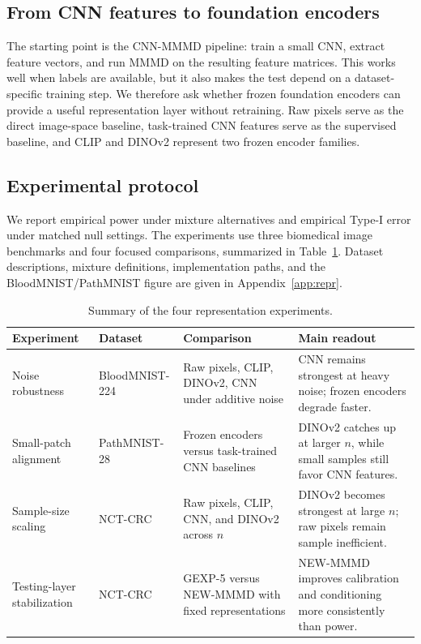 \documentclass[12pt]{article}
\begin{document}
\subsection{From CNN features to foundation encoders}

The starting point is the CNN-MMMD pipeline: train a small CNN, extract feature vectors, and run MMMD on the resulting feature matrices. This works well when labels are available, but it also makes the test depend on a dataset-specific training step. We therefore ask whether frozen foundation encoders can provide a useful representation layer without retraining. Raw pixels serve as the direct image-space baseline, task-trained CNN features serve as the supervised baseline, and CLIP and DINOv2 represent two frozen encoder families.

\subsection{Experimental protocol}

We report empirical power under mixture alternatives and empirical Type-I error under matched null settings. The experiments use three biomedical image benchmarks and four focused comparisons, summarized in Table~\ref{tab:foundation-exp-summary}. Dataset descriptions, mixture definitions, implementation paths, and the BloodMNIST/PathMNIST figure are given in Appendix~\ref{app:repr}.

\begin{table}[H]
\centering
\caption{Summary of the four representation experiments.}
\label{tab:foundation-exp-summary}
\scriptsize
\setlength{\tabcolsep}{3pt}
\begin{tabular}{>{\raggedright\arraybackslash}p{}
                >{\raggedright\arraybackslash}p{}
                >{\raggedright\arraybackslash}p{}
                >{\raggedright\arraybackslash}p{}}
\toprule
Experiment & Dataset & Comparison & Main readout \\
\midrule
Noise robustness & BloodMNIST-224 & Raw pixels, CLIP, DINOv2, CNN under additive noise & CNN remains strongest at heavy noise; frozen encoders degrade faster. \\
Small-patch alignment & PathMNIST-28 & Frozen encoders versus task-trained CNN baselines & DINOv2 catches up at larger \(n\), while small samples still favor CNN features. \\
Sample-size scaling & NCT-CRC & Raw pixels, CLIP, CNN, and DINOv2 across \(n\) & DINOv2 becomes strongest at large \(n\); raw pixels remain sample inefficient. \\
Testing-layer stabilization & NCT-CRC & GEXP-5 versus NEW-MMMD with fixed representations & NEW-MMMD improves calibration and conditioning more consistently than power. \\
\bottomrule
\end{tabular}
\end{table}
\end{document}
